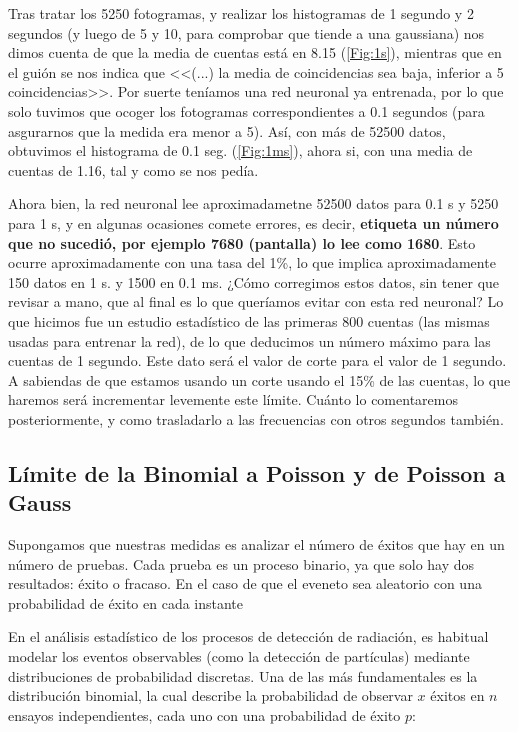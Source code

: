 \documentclass[11pt]{article}
\begin{document}
\vspace{1em}

Tras tratar los 5250 fotogramas, y realizar los histogramas de 1 segundo y 2 segundos (y luego de 5 y 10, para comprobar que tiende a una gaussiana) nos dimos cuenta de que la media de cuentas está en 8.15 (\cref{Fig:1s}), mientras que en el guión \cite{P2} se nos indica que <<(...) la media de coincidencias sea baja, inferior a 5 coincidencias>>. Por suerte teníamos una red neuronal ya entrenada, por lo que solo tuvimos que ocoger los fotogramas correspondientes a 0.1 segundos (para asgurarnos que la medida era menor a 5). Así, con más de 52500 datos, obtuvimos el histograma de 0.1 seg. (\cref{Fig:1ms}), ahora si, con una media de cuentas de 1.16, tal y como se nos pedía. 

Ahora bien, la red neuronal lee aproximadametne 52500 datos para 0.1 s y 5250 para 1 s, y en algunas ocasiones comete errores, es decir, \textbf{etiqueta un número que no sucedió, por ejemplo 7680 (pantalla) lo lee como 1680}. Esto ocurre aproximadamente con una tasa del 1\%, lo que implica aproximadamente 150 datos en 1 s. y 1500 en 0.1 ms. ¿Cómo corregimos estos datos, sin tener que revisar a mano, que al final es lo que queríamos evitar con esta red neuronal? Lo que hicimos fue un estudio estadístico de las primeras 800 cuentas (las mismas usadas para entrenar la red), de lo que deducimos un número máximo para las cuentas de 1 segundo. Este dato será el valor de corte para el valor de 1 segundo. A sabiendas de que estamos usando un corte usando el 15\% de las cuentas, lo que haremos será incrementar levemente este límite. Cuánto lo comentaremos posteriormente, y como trasladarlo a las frecuencias con otros segundos también.
 

\subsection{Límite de la Binomial a Poisson y de Poisson a Gauss}

Supongamos que nuestras medidas es analizar el número de éxitos que hay en un número de pruebas. Cada prueba es un proceso binario, ya que solo hay dos resultados: éxito o fracaso. En el caso de que el eveneto sea aleatorio con una probabilidad de éxito en cada instante 

En el análisis estadístico de los procesos de detección de radiación, es habitual modelar los eventos observables (como la detección de partículas) mediante distribuciones de probabilidad discretas. Una de las más fundamentales es la distribución binomial, la cual describe la probabilidad de observar \( x \) éxitos en \( n \) ensayos independientes, cada uno con una probabilidad de éxito \( p \): 
\end{document}
